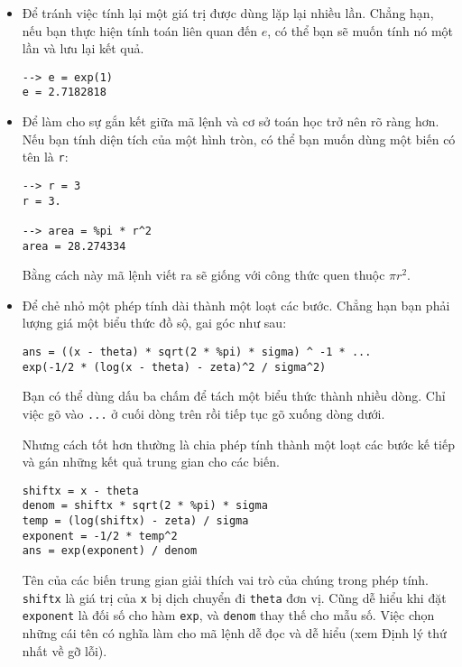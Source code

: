 \documentclass[12pt]{book}
\begin{document}
\begin{itemize}

\item Để tránh việc tính lại một giá trị được dùng lặp lại nhiều lần.
Chẳng hạn, nếu bạn thực hiện tính toán liên quan đến $e$, có thể
bạn sẽ muốn tính nó một lần và lưu lại kết quả.

\begin{verbatim}
--> e = exp(1)
e = 2.7182818
\end{verbatim}


\item Để làm cho sự gắn kết giữa mã lệnh và cơ sở toán học trở nên
rõ ràng hơn. Nếu bạn tính diện tích của một hình tròn, có thể bạn muốn
dùng một biến có tên là {\tt r}:

\begin{verbatim}
--> r = 3
r = 3.

--> area = %pi * r^2
area = 28.274334
\end{verbatim}
%
Bằng cách này mã lệnh viết ra sẽ giống với công thức quen thuộc $\pi r^2$.


\item Để chẻ nhỏ một phép tính dài thành một loạt các bước. Chẳng hạn
bạn phải lượng giá một biểu thức đồ sộ, gai góc như sau:

\begin{verbatim}
ans = ((x - theta) * sqrt(2 * %pi) * sigma) ^ -1 * ...
exp(-1/2 * (log(x - theta) - zeta)^2 / sigma^2)
\end{verbatim}
%
Bạn có thể dùng dấu ba chấm để tách một biểu thức thành nhiều dòng.
Chỉ việc gõ vào {\tt ...} ở cuối dòng trên rồi tiếp tục gõ xuống dòng dưới.

Nhưng cách tốt hơn thường là chia phép tính thành một loạt các bước
kế tiếp và gán những kết quả trung gian cho các biến.

\begin{verbatim}
shiftx = x - theta
denom = shiftx * sqrt(2 * %pi) * sigma
temp = (log(shiftx) - zeta) / sigma
exponent = -1/2 * temp^2
ans = exp(exponent) / denom
\end{verbatim}
%
Tên của các biến trung gian giải thích vai trò của chúng trong phép tính.
{\tt shiftx} là giá trị của {\tt x} bị dịch chuyển đi {\tt theta} đơn vị. Cũng 
dễ hiểu khi đặt {\tt exponent} là đối số cho hàm {\tt exp}, và {\tt denom} 
thay thế cho mẫu số. Việc chọn những cái tên có nghĩa làm cho mã lệnh 
dễ đọc và dễ hiểu (xem Định lý thứ nhất về gỡ lỗi).

\end{itemize}
\end{document}
